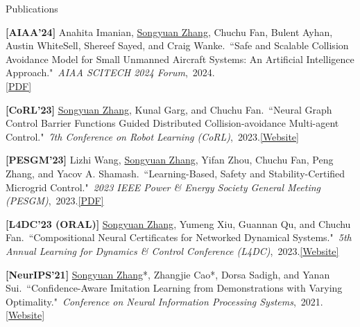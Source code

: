 \documentclass{resume} %
\newcommand{\paperItem}[4]{#1.~``#2."~\textit{#3},~#4.}%
\newcommand{\me}{\underline{Songyuan Zhang}}
\newcommand{\meshort}{\textbf{S. Zhang}}
\newcommand{\person}[2]{#1}
\begin{document}
\begin{rSection}{Publications}
{			\item {\bf [AIAA'24]}
			\paperItem{\person{Anahita Imanian}{A. Imanian}, \person{\me}{\meshort}, \person{Chuchu Fan}{C. Fan}, \person{Bulent Ayhan}{B. Ayhan}, \person{Austin WhiteSell}{A. WhiteSell}, \person{Shereef Sayed}{S. Sayed}, and \person{Craig Wanke}{C. Wanke}}{Safe and Scalable Collision Avoidance Model for Small Unmanned Aircraft Systems: An Artificial Intelligence Approach}{AIAA SCITECH 2024 Forum}{2024}\\{\href{https://arc.aiaa.org/doi/abs/10.2514/6.2024-1081}{[PDF]}}
			\item {\bf [CoRL'23]}
			\paperItem{\person{\me}{\meshort}, \person{Kunal Garg}{K. Garg}, and \person{Chuchu Fan}{C. Fan}}{Neural Graph Control Barrier Functions Guided Distributed Collision-avoidance Multi-agent Control}{7th Conference on Robot Learning (CoRL)}{2023}{\href{https://mit-realm.github.io/gcbf-website/}{[Website]}}
			\item {\bf [PESGM'23]}
			\paperItem{\person{Lizhi Wang}{L. Wang}, \person{\me}{\meshort}, \person{Yifan Zhou}{Y. Zhou}, \person{Chuchu Fan}{C. Fan}, \person{Peng Zhang}{P. Zhang}, and \person{Yacov A. Shamash}{YA. Shamash}}{Learning-Based, Safety and Stability-Certified Microgrid Control}{2023 IEEE Power \& Energy Society General Meeting (PESGM)}{2023}{\href{https://ieeexplore.ieee.org/stamp/stamp.jsp?arnumber=10253396}{[PDF]}}
			\item {\bf [L4DC'23 (ORAL)]}
			\paperItem{\person{\me}{\meshort}, \person{Yumeng Xiu}{Y. Xiu}, \person{Guannan Qu}{G. Qu}, and \person{Chuchu Fan}{C. Fan}}{Compositional Neural Certificates for Networked Dynamical Systems}{5th Annual Learning for Dynamics \& Control Conference (L4DC)}{2023}{\href{https://mit-realm.github.io/neuriss-website/}{[Website]}}
			\item {\bf [NeurIPS'21]}
			\paperItem{\person{\me*}{\meshort}, \person{Zhangjie Cao*}{Z. Cao}, \person{Dorsa Sadigh}{D. Sadigh}, and \person{Yanan Sui}{Y. Sui}}{Confidence-Aware Imitation Learning from Demonstrations with Varying Optimality}{Conference on Neural Information Processing Systems}{2021}{\href{https://sites.google.com/view/cail/}{[Website]}}
		}
	\end{rSection}
\end{document}
